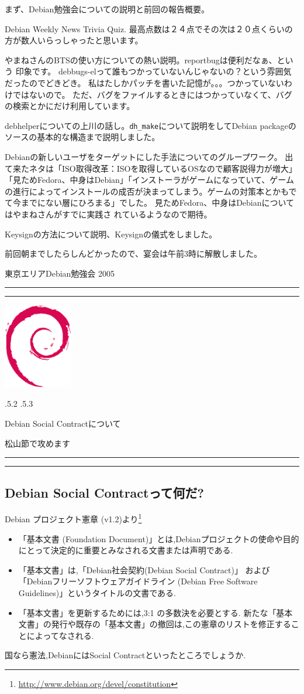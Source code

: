 \documentclass[mingoth]{jsarticle}
\makeatletter
\renewcommand{\section}{\@startsection{section}{1}{\z@}%
    {\Cvs \@plus.5\Cdp \@minus.2\Cdp}%
    {.5\Cvs \@plus.3\Cdp}%
    {\normalfont\Large\headfont\raggedright\centering}} %
\newcommand{\dancersection}[2]{%
\newpage
東京エリアDebian勉強会 2005
\hrule
\vspace{0.5mm}
\hrule
\hfill{}\includegraphics[width=3cm]{image200502/openlogo-nd.eps}\\
\vspace{-4cm}
\begin{center}
  \section{#1}
\end{center}
\hfill{}#2\hspace{3cm}\space\\
\hrule
\hrule
\vspace{1cm}
}
\makeatother
\begin{document}
まず、Debian勉強会についての説明と前回の報告概要。

Debian Weekly News Trivia Quiz. 最高点数は２４点でその次は２０点くらいの
方が数人いらっしゃったと思います。

やまねさんのBTSの使い方についての熱い説明。reportbugは便利だなぁ、という
印象です。
	    debbugs-elって誰もつかっていないんじゃないの？という雰囲気だったのでどきどき。
	    私はたしかパッチを書いた記憶が。。。つかっていないわけではないので。
	    ただ、バグをファイルするときにはつかっていなくて、バグの検索とかにだけ利用しています。

debhelperについての上川の話し。\verb!dh_make!について説明をしてDebian
packageのソースの基本的な構造まで説明しました。

Debianの新しいユーザをターゲットにした手法についてのグループワーク。
	  出て来たネタは「ISO取得改革：ISOを取得しているOSなので顧客説得力が増大」「見ためFedora、中身はDebian」「インストーラがゲームになっていて、ゲームの進行によってインストールの成否が決まってしまう。ゲームの対策本とかもでて今までにない層にひろまる」でした。
	    見ためFedora、中身はDebianについてはやまねさんがすでに実践さ
	  れているようなので期待。

	  Keysignの方法について説明、Keysignの儀式をしました。

前回朝までしたらしんどかったので、宴会は午前3時に解散しました。


\dancersection{Debian Social Contractについて}{松山節で攻めます}

\subsection{Debian Social Contractって何だ?}
Debian プロジェクト憲章 (v1.2)より\footnote{\url{http://www.debian.org/devel/constitution}}
\begin{itemize}
\item「基本文書 (Foundation Document)」とは,Debianプロジェクトの使命や目的にとって決定的に重要とみなされる文書または声明である.
\item「基本文書」は,「Debian社会契約(Debian Social Contract)」
および「Debianフリーソフトウェアガイドライン (Debian Free Software Guidelines)」というタイトルの文書である.
\item「基本文書」を更新するためには,3:1 の多数決を必要とする.
新たな「基本文書」の発行や既存の「基本文書」の撤回は,この憲章のリストを修正することによってなされる.
\end{itemize}
国なら憲法,DebianにはSocial Contractといったところでしょうか.
\end{document}
